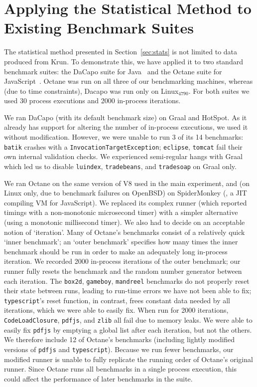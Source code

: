 \documentclass[acmsmall]{acmart}\settopmatter{printfolios=true}
\newcommand{\bencherfive}{Linux$_\mathrm{4790}$\xspace}
\newcommand{\numpexecs}{30\xspace}
\newcommand{\numiterations}{2000\xspace}
\begin{document}
\section{Applying the Statistical Method to Existing Benchmark Suites}
\label{sec:existing}

The statistical method presented in Section~\ref{sec:stats} is not limited to data
produced from Krun. To demonstrate this, we have applied it to two standard
benchmark suites: the DaCapo suite for Java~\cite{dacapo06} and the Octane
suite for JavaScript~\cite{octane}. Octane was
run on all three of our benchmarking machines, whereas (due to time
constraints), Dacapo was run only on \bencherfive. For both suites we used
\numpexecs process executions and \numiterations in-process iterations.

We ran DaCapo (with its default benchmark size) on Graal and HotSpot. As it already has support for
altering the number of in-process executions, we used it without modification.
However, we were unable to run 3 of its 14 benchmarks: \texttt{batik}
crashes with a \texttt{Invocation\-Target\-Exception}; \texttt{eclipse},
\texttt{tomcat} fail their own internal validation checks. We experienced
semi-regular hangs with Graal which led us to disable \texttt{luindex},
\texttt{tradebeans}, and \texttt{tradesoap} on Graal only.

We ran Octane on the same version of V8 used in the main experiment, and (on
Linux only, due to benchmark failures on OpenBSD) on SpiderMonkey
(\spidermonkeyversion, a JIT compiling VM for JavaScript).
We replaced its complex runner (which reported timings with a non-monotonic
microsecond timer) with a simpler alternative (using a monotonic millisecond
timer). We also had to decide on an acceptable notion of `iteration'. Many of Octane's
benchmarks consist of a relatively quick `inner benchmark'; an `outer benchmark'
specifies how many times the inner benchmark should be run in order to make an
adequately long in-process iteration. We recorded \numiterations
in-process iterations of the outer benchmark; our runner
fully resets the benchmark and the random number generator between each
iteration. The \texttt{box2d}, \texttt{gameboy}, \texttt{mandreel} benchmarks do
not properly reset their state between runs, leading to run-time errors we have
not been able to fix; \texttt{typescript}'s reset function, in contrast,
frees constant data needed by all iterations, which we were able
to easily fix. When run for \numiterations iterations, \texttt{CodeLoadClosure},
\texttt{pdfjs}, and \texttt{zlib} all fail due to memory leaks. We were able to
easily fix \texttt{pdfjs} by emptying a global list after each iteration, but not the
others. We therefore include 12 of Octane's benchmarks (including lightly
modified versions of \texttt{pdfjs} and \texttt{typescript}).
Because we run fewer benchmarks, our modified runner is unable to fully
replicate the running order of Octane's original runner. Since Octane runs all
benchmarks in a single process execution, this could affect the performance of
later benchmarks in the suite.
\end{document}
